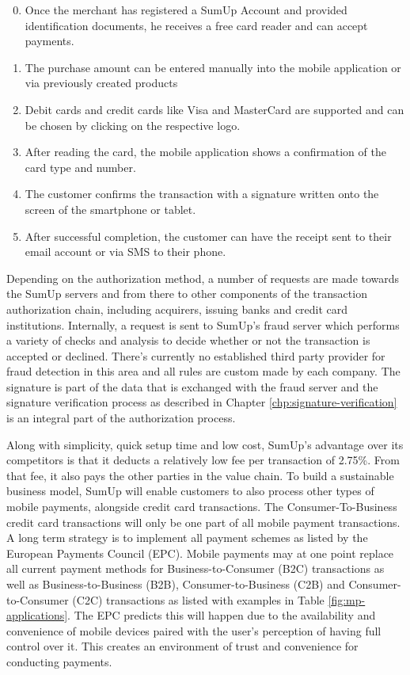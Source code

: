 \documentclass[a4paper, oneside]{csthesis}
\begin{document}
\begin{enumerate}
\setcounter{enumi}{-1}
    \item Once the merchant has registered a SumUp Account and provided identification documents, he receives a free card reader and can accept payments.
    \item The purchase amount can be entered manually into the mobile application or via previously created products
    \item Debit cards and credit cards like Visa and MasterCard are supported and can be chosen by clicking on the respective logo.
    \item After reading the card, the mobile application shows a confirmation of the card type and number.
    \item The customer confirms the transaction with a signature written onto the screen of the smartphone or tablet.
    \item After successful completion, the customer can have the receipt sent to their email account or via SMS to their phone.
\end{enumerate}


Depending on the authorization method, a number of requests are made towards the SumUp servers and from there to other components of the transaction authorization chain, including acquirers, issuing banks and credit card institutions. Internally, a request is sent to SumUp's fraud server which performs a variety of checks and analysis to decide whether or not the transaction is accepted or declined. There's currently no established third party provider for fraud detection in this area and all rules are custom made by each company. The signature is part of the data that is exchanged with the fraud server and the signature verification process as described in Chapter \ref{chp:signature-verification} is an integral part of the  authorization process.

Along with simplicity, quick setup time and low cost, SumUp's advantage over its competitors is that it deducts a relatively low fee per transaction of 2.75\%. From that fee, it also pays the other parties in the value chain. To build a sustainable business model, SumUp will enable customers to also process other types of mobile payments, alongside credit card transactions. The Consumer-To-Business credit card transactions will only be one part of all mobile payment transactions. A long term strategy is to implement all payment schemes as listed by the European Payments Council (EPC). Mobile payments may at one point replace all current payment methods for Business-to-Consumer (B2C) transactions as well as Business-to-Business (B2B), Consumer-to-Business (C2B) and Consumer-to-Consumer (C2C) transactions as listed with examples in Table \ref{fig:mp-applications}. The EPC predicts this will happen due to the availability and convenience of mobile devices paired with the user's perception of having full control over it. This creates an environment of trust and convenience for conducting payments. \cite{mpwhitepaper}
\end{document}
